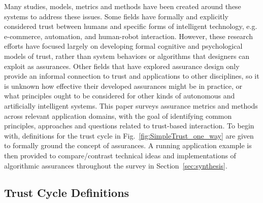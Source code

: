 Many studies, models, metrics and methods have been created around these systems to address these issues.
Some fields have formally and explicitly considered trust between humans and specific forms of intelligent technology, e.g. e-commerce, automation, and human-robot interaction. However, these research efforts have focused largely on developing formal cognitive and psychological models of trust, rather than system behaviors or algorithms that designers can exploit as assurances. 
Other fields that have explored assurance design only provide an informal connection to trust and applications to other disciplines, so it is unknown how effective their developed assurances might be in practice, or what principles ought to be considered for other kinds of autonomous and artificially intelligent systems. 
This paper surveys assurance metrics and methods across relevant application domains, with the goal of
identifying common principles, approaches and questions related to trust-based interaction.
To begin with, definitions for the trust cycle in Fig.~\ref{fig:SimpleTrust_one_way} are given to formally ground the concept of assurances. A running application example is then provided to compare/contrast technical ideas and implementations of algorithmic assurances throughout the survey in Section~\ref{sec:synthesis}. 


\subsection{Trust Cycle Definitions} \label{sec:trust_definitions}



